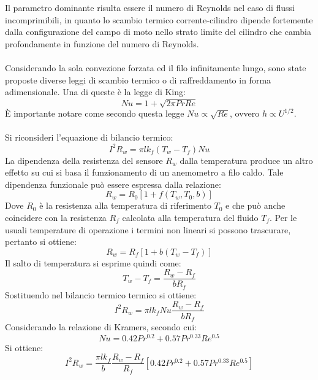Il parametro dominante risulta essere il numero di Reynolds nel caso di flussi incomprimibili, in quanto lo scambio termico corrente-cilindro dipende fortemente dalla configurazione del campo di moto nello strato limite del cilindro che cambia profondamente in funzione del numero di Reynolds.\\\\
Considerando la sola convezione forzata ed il filo infinitamente lungo, sono state proposte diverse leggi di scambio termico o di raffreddamento in forma adimensionale. Una di queste è la legge di King:
\begin{equation*}
    Nu = 1 +\sqrt{2\pi Pr Re}
\end{equation*}
È importante notare come secondo questa legge $Nu\propto \sqrt{Re}$, ovvero $h\propto U^{1/2}$.\\\\
Si riconsideri l'equazione di bilancio termico:
\begin{equation*}
    I^2 R_w = \pi l k_f (T_w - T_f) Nu
\end{equation*}
La dipendenza della resistenza del sensore $R_w$ dalla temperatura produce un altro effetto su cui si basa il funzionamento di un anemometro a filo caldo. Tale dipendenza funzionale può essere espressa dalla relazione:
\begin{equation*}
    R_w = R_0 [1 + f(T_w, T_0, b)]
\end{equation*}
Dove $R_0$ è la resistenza alla temperatura di riferimento $T_0$ e che può anche coincidere con la resistenza $R_f$ calcolata alla temperatura del fluido $T_f$. Per le usuali temperature di operazione i termini non lineari si possono trascurare, pertanto si ottiene:
\begin{equation*}
    R_w = R_f[1+b(T_w-T_f)]
\end{equation*}
Il salto di temperatura si esprime quindi come:
\begin{equation*}
    T_w - T_f = \frac{R_w - R_f}{bR_f}
\end{equation*}
Sostituendo nel bilancio termico termico si ottiene:
\begin{equation*}
    I^2 R_w = \pi l k_f Nu \frac{R_w - R_f}{bR_f}
\end{equation*}
Considerando la relazione di Kramers, secondo cui:
\begin{equation*}
    Nu = 0.42 Pr^{0.2} + 0.57 Pr^{0.33} Re^{0.5}
\end{equation*}
Si ottiene:
\begin{equation*}
    I^2R_w = \frac{\pi l k_f}b \frac{R_w - R_f}{R_f} [0.42 Pr^{0.2} + 0.57 Pr^{0.33} Re^{0.5}]
\end{equation*}
